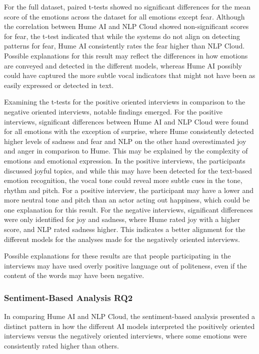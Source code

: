 For the full dataset, paired t-tests showed no significant differences for the mean score of the emotions across the dataset for all emotions except fear. Although the correlation between Hume AI and NLP Cloud showed non-significant scores for fear, the t-test indicated that while the systems do not align on detecting patterns for fear, Hume AI consistently rates the fear higher than NLP Cloud. Possible explanations for this result may reflect the differences in how emotions are conveyed and detected in the different models, whereas Hume AI possibly could have captured the more subtle vocal indicators that might not have been as easily expressed or detected in text.

Examining the t-tests for the positive oriented interviews in comparison to the negative oriented interviews, notable findings emerged.
For the positive interviews, significant differences between Hume AI and NLP Cloud were found for all emotions with the exception of surprise, where Hume consistently detected higher levels of sadness and fear and NLP on the other hand overestimated joy and anger in comparison to Hume.
This may be explained by the complexity of emotions and emotional expression. In the positive interviews, the participants discussed joyful topics, and while this may have been detected for the text-based emotion recognition, the vocal tone could reveal more subtle cues in the tone, rhythm and pitch. For a positive interview, the participant may have a lower and more neutral tone and pitch than an actor acting out happiness, which could be one explanation for this result.
For the negative interviews, significant differences were only identified for joy and sadness, where Hume rated joy with a higher score, and NLP rated sadness higher. This indicates a better alignment for the different models for the analyses made for the negatively oriented interviews.

Possible explanations for these results are that people participating in the interviews may have used overly positive language out of politeness, even if the content of the words may have been negative.
\subsubsection{Sentiment-Based Analysis RQ2}
In comparing Hume AI and NLP Cloud, the sentiment-based analysis presented a distinct pattern in how the different AI models interpreted the positively oriented interviews versus the negatively oriented interviews, where some emotions were consistently rated higher than others.

